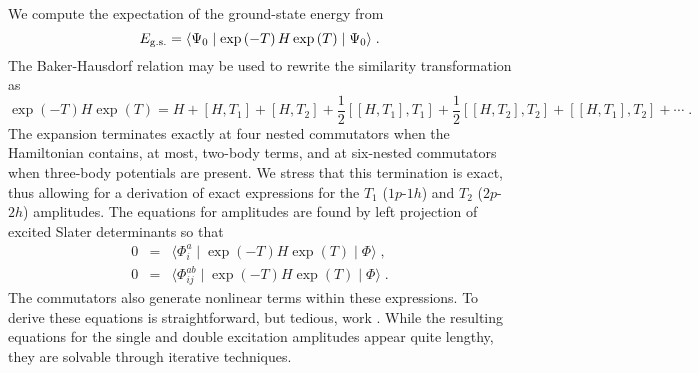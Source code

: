 \documentclass[twoside,12pt]{article}
\begin{document}
We compute the expectation of the ground-state energy from
\begin{equation}
E_{\rm g.s.}=\langle\Psi_0\mid \exp\left(-T\right) H \exp\left(T\right)
\mid\Psi_0\rangle\;. 
\end{equation}
The Baker-Hausdorf relation may be used to rewrite the similarity
transformation as
\begin{equation}
\exp\left(-T\right) H \exp\left(T\right) =
H+\left[H,T_1\right]+\left[H,T_2\right]
+\frac{1}{2}\left[\left[H,T_1\right],T_1\right]
+\frac{1}{2}\left[\left[H,T_2\right],T_2\right]
+\left[\left[H,T_1\right],T_2\right]+\cdots \;.
\end{equation}
The expansion terminates exactly at four nested commutators  when
the Hamiltonian contains, at most, two-body terms, and at six-nested 
commutators when  three-body potentials are present. 
We stress that
this termination is exact, thus allowing for a derivation of exact
expressions for the $T_1$ ($1p$-$1h$) and 
$T_2$ ($2p$-$2h$) amplitudes. 
The equations for amplitudes are found by left projection of
excited Slater determinants
so that
\begin{eqnarray}
0 &=& \langle\Phi_i^a\mid 
\exp\left(-T\right) H \exp\left(T\right) \mid \Phi\rangle\;,  \nonumber \\ 
0 &=& \langle\Phi_{ij}^{ab}\mid 
\exp\left(-T\right) H \exp\left(T\right) \mid \Phi\rangle \;.
\label{project_eqns}
\end{eqnarray}
The commutators also generate nonlinear terms within these expressions. 
To derive these equations
is straightforward, but tedious, work \cite{comp_chem_rev00}.
While the resulting equations for the single and double excitation
amplitudes  appear quite lengthy, they are 
solvable through iterative techniques. 
\end{document}

